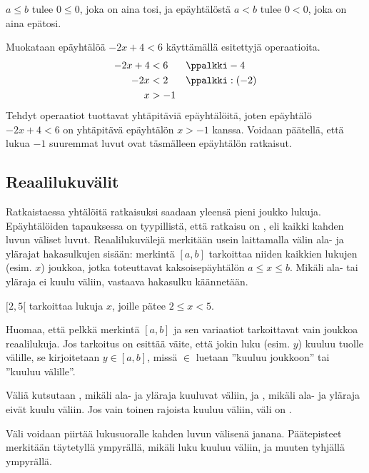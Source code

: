 \begin{esimerkki}
$a \leq b$ tulee $0 \leq 0$, joka on aina tosi, ja epäyhtälöstä $a < b$ tulee $0 < 0$, joka on aina epätosi.
\end{esimerkki}

\begin{esimerkki}
Muokataan epäyhtälöä $-2x+4<6$ käyttämällä esitettyjä operaatioita.
\begin{align*}
-2x+4&<6 && \ppalkki -4 \\
-2x&<2 && \ppalkki :(-2) \\
x&>-1
\end{align*}
Tehdyt operaatiot tuottavat yhtäpitäviä epäyhtälöitä, joten epäyhtälö $-2x+4<6$ on yhtäpitävä epäyhtälön $x>-1$ kanssa. Voidaan päätellä, että lukua $-1$ suuremmat luvut ovat täsmälleen epäyhtälön ratkaisut.
\end{esimerkki}

\subsection{Reaalilukuvälit}

Ratkaistaessa yhtälöitä ratkaisuksi saadaan yleensä pieni joukko lukuja. Epäyhtälöiden tapauksessa on tyypillistä, että ratkaisu on , eli kaikki kahden luvun väliset luvut. Reaalilukuvälejä merkitään usein laittamalla välin ala- ja ylärajat hakasulkujen sisään: merkintä $[a, b]$ tarkoittaa niiden kaikkien lukujen (esim. $x$) joukkoa, jotka toteuttavat kaksoisepäyhtälön $a \leq x \leq b$. Mikäli ala- tai yläraja ei kuulu väliin, vastaava hakasulku käännetään.

\begin{esimerkki}
$[2,5[$ tarkoittaa lukuja $x$, joille pätee $2 \leq x < 5$. %
\end{esimerkki}

Huomaa, että pelkkä merkintä $[a,b]$ ja sen variaatiot tarkoittavat vain joukkoa reaalilukuja. Jos tarkoitus on esittää väite, että jokin luku (esim. $y$) kuuluu tuolle välille, se kirjoitetaan $y \in [a,b]$, missä $\in$ luetaan ''kuuluu joukkoon'' tai ''kuuluu välille''.

Väliä kutsutaan , mikäli ala- ja yläraja kuuluvat väliin, ja , mikäli ala- ja yläraja eivät kuulu väliin. Jos vain toinen rajoista kuuluu väliin, väli on .

Väli voidaan piirtää lukusuoralle kahden luvun välisenä janana. Päätepisteet merkitään täytetyllä ympyrällä, mikäli luku kuuluu väliin, ja muuten tyhjällä ympyrällä.

